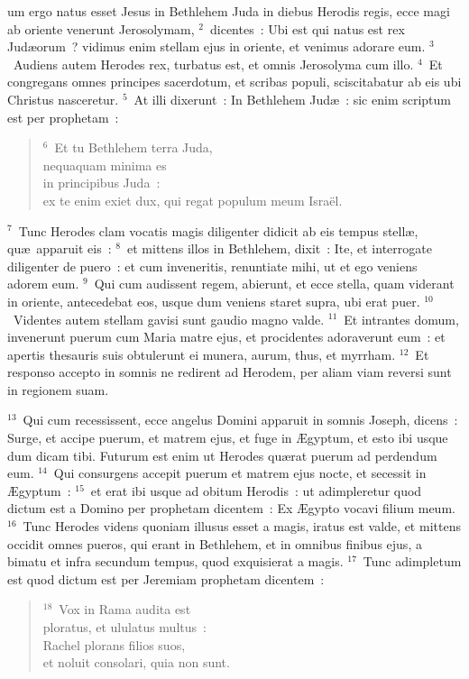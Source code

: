 \bchapter
{}um ergo natus esset Jesus in Bethlehem Juda in diebus Herodis regis, ecce magi ab oriente venerunt Jerosolymam,
${}^{2}$~dicentes~: Ubi est qui natus est rex Jud\ae orum~? vidimus enim stellam ejus in oriente, et venimus adorare eum.
${}^{3}$~Audiens autem Herodes rex, turbatus est, et omnis Jerosolyma cum illo.
${}^{4}$~Et congregans omnes principes sacerdotum, et scribas populi, sciscitabatur ab eis ubi Christus nasceretur.
${}^{5}$~At illi dixerunt~: In Bethlehem Jud\ae~: sic enim scriptum est per prophetam~:
\begin{flushleft}\begin{verse}${}^{6}$~Et tu Bethlehem terra Juda,\\ nequaquam minima es\\ in principibus Juda~:\\ ex te enim exiet dux, qui regat populum meum Isra\"el.\end{verse}\end{flushleft}


${}^{7}$~Tunc Herodes clam vocatis magis diligenter didicit ab eis tempus stell\ae , qu\ae\ apparuit eis~:
${}^{8}$~et mittens illos in Bethlehem, dixit~: Ite, et interrogate diligenter de puero~: et cum inveneritis, renuntiate mihi, ut et ego veniens adorem eum.
${}^{9}$~Qui cum audissent regem, abierunt, et ecce stella, quam viderant in oriente, antecedebat eos, usque dum veniens staret supra, ubi erat puer.
${}^{10}$~Videntes autem stellam gavisi sunt gaudio magno valde.
${}^{11}$~Et intrantes domum, invenerunt puerum cum Maria matre ejus, et procidentes adoraverunt eum~: et apertis thesauris suis obtulerunt ei munera, aurum, thus, et myrrham.
${}^{12}$~Et responso accepto in somnis ne redirent ad Herodem, per aliam viam reversi sunt in regionem suam.


${}^{13}$~Qui cum recessissent, ecce angelus Domini apparuit in somnis Joseph, dicens~: Surge, et accipe puerum, et matrem ejus, et fuge in \AE gyptum, et esto ibi usque dum dicam tibi. Futurum est enim ut Herodes qu\ae rat puerum ad perdendum eum.
${}^{14}$~Qui consurgens accepit puerum et matrem ejus nocte, et secessit in \AE gyptum~:
${}^{15}$~et erat ibi usque ad obitum Herodis~: ut adimpleretur quod dictum est a Domino per prophetam dicentem~: Ex \AE gypto vocavi filium meum.
${}^{16}$~Tunc Herodes videns quoniam illusus esset a magis, iratus est valde, et mittens occidit omnes pueros, qui erant in Bethlehem, et in omnibus finibus ejus, a bimatu et infra secundum tempus, quod exquisierat a magis.
${}^{17}$~Tunc adimpletum est quod dictum est per Jeremiam prophetam dicentem~:
\begin{flushleft}\begin{verse}${}^{18}$~Vox in Rama audita est\\ ploratus, et ululatus multus~:\\ Rachel plorans filios suos,\\ et noluit consolari, quia non sunt.\end{verse}\end{flushleft}


